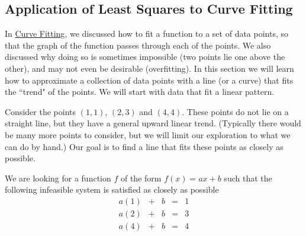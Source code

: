 \documentclass{ximera}
\begin{document}
\subsection*{Application of Least Squares to Curve Fitting}
In \href{https://ximera.osu.edu/linearalgebradzv3/LinearAlgebraInteractiveIntro/APP-0070/main}{Curve Fitting}, we discussed how to fit a function to a set of data points, so that the graph of the function passes through each of the points.  We also discussed why doing so is sometimes impossible (two points lie one above the other), and may not even be desirable (overfitting).  In this section we will learn how to approximate a collection of data points with a line (or a curve) that fits the ``trend" of the points.  We will start with data that fit a linear pattern.  

\begin{exploration}\label{exp:leastSq2}
    Consider the points $(1,1)$, $(2, 3)$ and $(4,4)$.  These points do not lie on a straight line, but they have a general upward linear trend.  (Typically there would be many more points to consider, but we will limit our exploration to what we can do by hand.)  Our goal is to find a line that fits these points as closely as possible.  

    We are looking for a function $f$ of the form $f(x)=ax+b$ such that the following infeasible system is satisfied as closely as possible
    $$\begin{matrix}a(1)&+&b&=&1\\a(2)&+&b&=&3\\a(4)&+&b&=&4\end{matrix}$$


\end{exploration}
\end{document}
